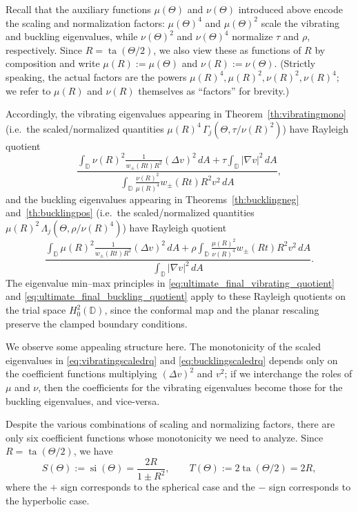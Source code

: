 \documentclass[11pt]{amsart}
\theoremstyle{definition}
\numberwithin{equation}{section}
\newcommand{\lapl}{\Delta}
\newcommand{\grad}{\nabla}
\newcommand{\D}{\mathbb{D}}
\newcommand{\si}{\operatorname{si}}
\newcommand{\ta}{\operatorname{ta}}
\begin{document}
Recall that the auxiliary functions $\mu(\Theta)$ and $\nu(\Theta)$ introduced above encode the scaling and normalization factors: $\mu(\Theta)^4$ and $\mu(\Theta)^2$ scale the vibrating and buckling eigenvalues, while $\nu(\Theta)^2$ and $\nu(\Theta)^4$ normalize $\tau$ and $\rho$, respectively. Since $R=\ta(\Theta/2)$, we also view these as functions of $R$ by composition and write $\mu(R):=\mu(\Theta)$ and $\nu(R):=\nu(\Theta)$. (Strictly speaking, the actual factors are the powers $\mu(R)^4,\mu(R)^2,\nu(R)^2,\nu(R)^4$; we refer to $\mu(R)$ and $\nu(R)$ themselves as ``factors'' for brevity.)

Accordingly, the vibrating eigenvalues appearing in Theorem~\ref{th:vibratingmono} (i.e.\ the scaled/normalized quantities $\mu(R)^4\,\Gamma_j(\Theta,\tau/\nu(R)^2)$) have Rayleigh quotient
\begin{equation}\label{eq:vibratingscaledrq}
\dfrac{\displaystyle \int_{\D}\nu(R)^2\frac{1}{w_\pm(Rt)R^2}(\lapl v)^2 \,  dA +  \tau\int_{\D}|\grad v|^2 \, dA}{\displaystyle \int_{\D} \frac{\nu(R)^2}{\mu(R)^4}w_\pm(Rt)R^2v^2 \, dA},
\end{equation}
and the buckling eigenvalues appearing in Theorems~\ref{th:bucklingneg} and~\ref{th:bucklingpos} (i.e.\ the scaled/normalized quantities $\mu(R)^2\,\Lambda_j(\Theta,\rho/\nu(R)^4)$) have Rayleigh quotient
\begin{equation}\label{eq:bucklingscaledrq}
\dfrac{\displaystyle \int_{\D}\mu(R)^2\frac{1}{w_\pm(Rt)R^2}(\lapl v)^2 \,  dA +  \rho\int_{\D} \frac{\mu(R)^2}{\nu(R)^4}w_\pm(Rt)R^2v^2 \, dA}{\displaystyle \int_{\D} |\grad v|^2 \, dA}.
\end{equation}
The eigenvalue min--max principles in \eqref{eq:ultimate_final_vibrating_quotient} and \eqref{eq:ultimate_final_buckling_quotient} apply to these Rayleigh quotients on the trial space $H_0^2(\D)$, since the conformal map and the planar rescaling preserve the clamped boundary conditions.

We observe some appealing structure here. The monotonicity of the scaled eigenvalues in \eqref{eq:vibratingscaledrq} and \eqref{eq:bucklingscaledrq} depends only on the coefficient functions multiplying $(\lapl v)^2$ and $v^2$; if we interchange the roles of $\mu$ and $\nu$, then the coefficients for the vibrating eigenvalues become those for the buckling eigenvalues, and vice-versa.

Despite the various combinations of scaling and normalizing factors, there are only six coefficient functions whose monotonicity we need to analyze.  Since $R=\ta(\Theta/2)$, we have
\[
S(\Theta) := \si(\Theta) = \frac{2R}{1\pm R^2}, \qquad
T(\Theta) := 2\ta(\Theta/2) = 2R,
\]
where the $+$ sign corresponds to the spherical case and the $-$ sign corresponds to the hyperbolic case.
\end{document}
